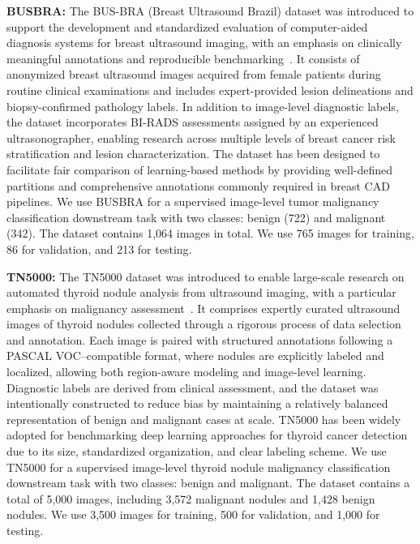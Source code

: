 \documentclass{article}
\theoremstyle{plain}
\theoremstyle{definition}
\theoremstyle{remark}
\begin{document}
\textbf{BUSBRA:} The BUS-BRA (Breast Ultrasound Brazil) dataset was introduced to support the development and standardized evaluation of computer-aided diagnosis systems for breast ultrasound imaging, with an emphasis on clinically meaningful annotations and reproducible benchmarking~\cite{GomezFlores2024BUSBRA:Systems}. It consists of anonymized breast ultrasound images acquired from female patients during routine clinical examinations and includes expert-provided lesion delineations and biopsy-confirmed pathology labels. In addition to image-level diagnostic labels, the dataset incorporates BI-RADS assessments assigned by an experienced ultrasonographer, enabling research across multiple levels of breast cancer risk stratification and lesion characterization. The dataset has been designed to facilitate fair comparison of learning-based methods by providing well-defined partitions and comprehensive annotations commonly required in breast CAD pipelines. We use BUSBRA for a supervised image-level tumor malignancy classification downstream task with two classes: benign (722) and malignant (342). The dataset contains 1,064 images in total. We use 765 images for training, 86 for validation, and 213 for testing.


\textbf{TN5000:} The TN5000 dataset was introduced to enable large-scale research on automated thyroid nodule analysis from ultrasound imaging, with a particular emphasis on malignancy assessment~\cite{Zhang2025TN5000:Classification}. It comprises expertly curated ultrasound images of thyroid nodules collected through a rigorous process of data selection and annotation. Each image is paired with structured annotations following a PASCAL VOC–compatible format, where nodules are explicitly labeled and localized, allowing both region-aware modeling and image-level learning. Diagnostic labels are derived from clinical assessment, and the dataset was intentionally constructed to reduce bias by maintaining a relatively balanced representation of benign and malignant cases at scale. TN5000 has been widely adopted for benchmarking deep learning approaches for thyroid cancer detection due to its size, standardized organization, and clear labeling scheme. We use TN5000 for a supervised image-level thyroid nodule malignancy classification downstream task with two classes: benign and malignant. The dataset contains a total of 5,000 images, including 3,572 malignant nodules and 1,428 benign nodules. We use 3,500 images for training, 500 for validation, and 1,000 for testing. 
\end{document}
